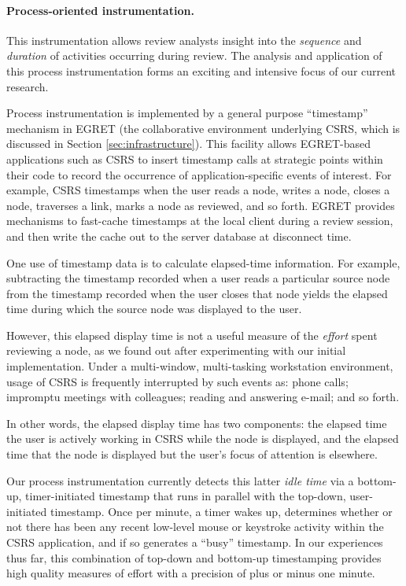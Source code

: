 \paragraph{Process-oriented instrumentation.} This instrumentation allows review
analysts insight into the {\em sequence}\/ and {\em duration}\/ of
activities occurring during review.  The analysis and application of this
process instrumentation forms an exciting and intensive focus of our
current research.

Process instrumentation is implemented by a general purpose ``timestamp''
mechanism in EGRET (the collaborative environment underlying CSRS, which is
discussed in Section \ref{sec:infrastructure}).  This facility allows
EGRET-based applications such as CSRS to insert timestamp calls at
strategic points within their code to record the occurrence of
application-specific events of interest. For example, CSRS timestamps when
the user reads a node, writes a node, closes a node, traverses a link,
marks a node as reviewed, and so forth.  EGRET provides mechanisms to
fast-cache timestamps at the local client during a review session, and then
write the cache out to the server database at disconnect time.

One use of timestamp data is to calculate elapsed-time information.  For
example, subtracting the timestamp recorded when a user reads a particular
source node from the timestamp recorded when the user closes that node
yields the elapsed time during which the source node was displayed to the
user.

However, this elapsed display time is not a useful measure of the {\em
effort} spent reviewing a node, as we found out after experimenting with
our initial implementation.  Under a multi-window, multi-tasking
workstation environment, usage of CSRS is frequently interrupted by such
events as: phone calls; impromptu meetings with colleagues; reading and
answering e-mail; and so forth.

In other words, the elapsed display time has two components: the elapsed
time the user is actively working in CSRS while the node is displayed, and
the elapsed time that the node is displayed but the user's focus of
attention is elsewhere.

Our process instrumentation currently detects this latter {\em idle time}\/
via a bottom-up, timer-initiated timestamp that runs in parallel with the
top-down, user-initiated timestamp.  Once per minute, a timer wakes up,
determines whether or not there has been any recent low-level mouse or
keystroke activity within the CSRS application, and if so generates a
``busy'' timestamp. In our experiences thus far, this combination of
top-down and bottom-up timestamping provides high quality measures of
effort with a precision of plus or minus one minute.


